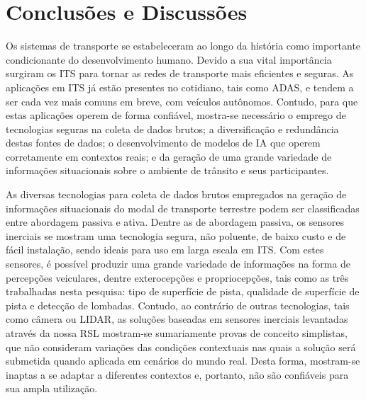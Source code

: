 \chapter{Conclusões e Discussões}
\label{cap:conclusoes_discussoes}

Os sistemas de transporte se estabeleceram ao longo da história como importante condicionante do desenvolvimento humano. Devido a sua vital importância surgiram os ITS para tornar as redes de transporte mais eficientes e seguras. As aplicações em ITS já estão presentes no cotidiano, tais como ADAS, e tendem a ser cada vez mais comuns em breve, com veículos autônomos. Contudo, para que estas aplicações operem de forma confiável, mostra-se necessário o emprego de tecnologias seguras na coleta de dados brutos; a diversificação e redundância destas fontes de dados; o desenvolvimento de modelos de IA que operem corretamente em contextos reais; e da geração de uma grande variedade de informações situacionais sobre o ambiente de trânsito e seus participantes. 

As diversas tecnologias para coleta de dados brutos empregados na geração de informações situacionais do modal de transporte terrestre podem ser classificadas entre abordagem passiva e ativa. Dentre as de abordagem passiva, os sensores inerciais se mostram uma tecnologia segura, não poluente, de baixo custo e de fácil instalação, sendo ideais para uso em larga escala em ITS. Com estes sensores, é possível produzir uma grande variedade de informações na forma de percepções veiculares, dentre exterocepções e propriocepções, tais como as três trabalhadas nesta pesquisa: tipo de superfície de pista, qualidade de superfície de pista e detecção de lombadas. Contudo, ao contrário de outras tecnologias, tais como câmera ou LIDAR, as soluções baseadas em sensores inerciais levantadas através da nossa RSL mostram-se sumariamente provas de conceito simplistas, que não consideram variações das condições contextuais nas quais a solução será submetida quando aplicada em cenários do mundo real. Desta forma, mostram-se inaptas a se adaptar a diferentes contextos e, portanto, não são confiáveis para sua ampla utilização. 

